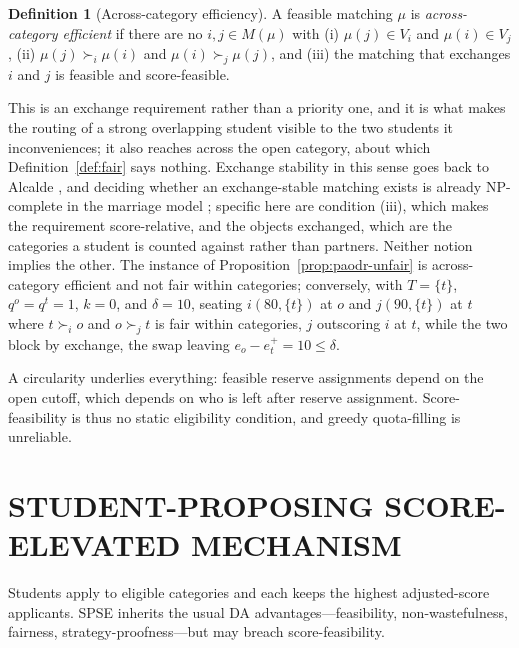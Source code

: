 \documentclass[a4paper,twoside]{article}
\theoremstyle{definition}
\newtheorem{definition}{Definition}
\begin{document}
\begin{definition}[Across-category efficiency]
\label{def:acrosseff}
A feasible matching $\mu$ is \emph{across-category efficient} if there are no $i,j\in M(\mu)$ with (i) $\mu(j)\in V_i$ and $\mu(i)\in V_j$, (ii) $\mu(j)\succ_i\mu(i)$ and $\mu(i)\succ_j\mu(j)$, and (iii) the matching that exchanges $i$ and $j$ is feasible and score-feasible.
\end{definition}

This is an exchange requirement rather than a priority one, and it is what makes the routing of a strong overlapping student visible to the two students it inconveniences; it also reaches across the open category, about which Definition~\ref{def:fair} says nothing. Exchange stability in this sense goes back to Alcalde \cite{Alca94a}, and deciding whether an exchange-stable matching exists is already NP-complete in the marriage model \cite{CeMa05a}; specific here are condition (iii), which makes the requirement score-relative, and the objects exchanged, which are the categories a student is counted against rather than partners. Neither notion implies the other. The instance of Proposition~\ref{prop:paodr-unfair} is across-category efficient and not fair within categories; conversely, with $T=\{t\}$, $q^o=q^t=1$, $k=0$, and $\delta=10$, seating $i(80,\{t\})$ at $o$ and $j(90,\{t\})$ at $t$ where $t\succ_i o$ and $o\succ_j t$ is fair within categories, $j$ outscoring $i$ at $t$, while the two block by exchange, the swap leaving $e_o-e_t^+=10\le\delta$.

A circularity underlies everything: feasible reserve assignments depend on the open cutoff, which depends on who is left after reserve assignment. Score-feasibility is thus no static eligibility condition, and greedy quota-filling is unreliable.

\section{\uppercase{Student-Proposing Score-Elevated Mechanism}}
\label{sec:spse}


Students apply to eligible categories and each keeps the highest adjusted-score applicants. SPSE inherits the usual DA advantages---feasibility, non-wastefulness, fairness, strategy-proofness---but may breach score-feasibility.
\end{document}
